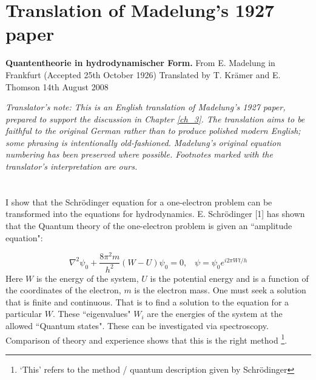 \section{Translation of Madelung's 1927 paper}
\begin{center}
          {\large\bf Quantentheorie in hydrodynamischer Form.} \newline
		From E. Madelung in Frankfurt \newline
 		(Accepted 25th October 1926) \newline
	Translated by T. Kr\"amer and E. Thomson \newline
			14th August 2008 \newline
\end{center}

\vspace{0.5cm}
\noindent \textit{Translator's note: This is an English translation of Madelung's 1927 paper, prepared to support the discussion in Chapter \ref{ch_3}. The translation aims to be faithful to the original German rather than to produce polished modern English; some phrasing is intentionally old-fashioned. Madelung's original equation numbering has been preserved where possible. Footnotes marked with the translator's interpretation are ours.}
\vspace{0.5cm}

\section*{}
\label{app_m}
\noindent I show that the Schr\"odinger equation for a one-electron problem can be transformed into the equations for hydrodynamics.
\newline
\newline
\noindent E. Schr\"odinger [1] has shown that the Quantum theory of the one-electron problem is given an ``amplitude equation":

\begin{equation}
\label{one}
\nabla^2 \psi_0 + \frac{8 \pi^2 m}{h^2}(W-U)\psi_0 = 0, \;\;\; \psi = \psi_0 e^{i2\pi Wt/h}
\end{equation}
Here $W$ is the energy of the system, $U$ is the potential energy and is a function of the coordinates of the electron, $m$ is the electron mass. One must seek a solution that is finite and continuous. That is to find a solution to the equation for a particular $W$. These ``eigenvalues" $W_i$ are the energies of the system at the allowed ``Quantum states". These can be investigated via spectroscopy. Comparison of theory and experience shows that this is the right method \footnote{`This' refers to the method / quantum description given by Schr\"odinger}.

